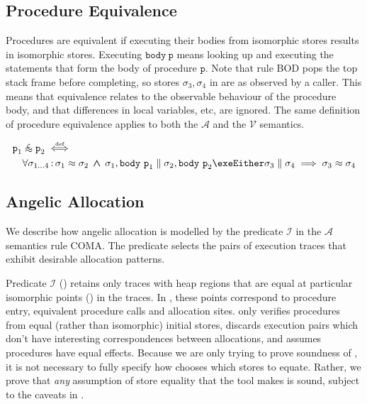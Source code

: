 \documentclass[runningheads,a4paper]{llncs}
\DeclareMathOperator{\band}{\bm{\;\land\;}}
\DeclareMathOperator{\suchthat}{:}
\newcommand*{\qvars}[2]{#1_{#2}}
\newcommand*{\defiff}{\stackrel{\text{\tiny def}}{\iff}}
\newcommand*{\sima}[1]{%
  \mathrel{\vcenter{\offinterlineskip
  \hbox{$\scriptscriptstyle\,\mathcal{#1}$}\vskip-.00ex\hbox{$\sim$}\vskip-.35ex\hbox{$\sim$}}}}
\newcommand*\iso{\approx}
\newcommand*\isol{\sima{L}}
\newcommand*{\parcomp}{\parallel}
\newcommand*\Asemantics{\mathcal{A}}
\newcommand*\asemantics{$\Asemantics$ semantics}
\newcommand*\Vsemantics{\mathcal{V}}
\newcommand*{\composeRuleAbstract}{\textnormal{COMA}}
\newcommand*{\bodyRule}{\textnormal{BOD}}
\newcommand*{\body}{\mathtt{body}}
\newcommand*{\fun}{\texttt{p}}
\newcommand*{\isoR}{\mathcal{I}}
\newcommand*{\store}{\sigma}
\begin{document}
\subsection{Procedure Equivalence}

Procedures are equivalent if executing their bodies from isomorphic stores results in isomorphic stores. Executing $\body~\fun$ means looking up and executing the statements that form the body of procedure $\fun$. Note that rule \bodyRule{} pops the top stack frame before completing, so stores $\store_3,\store_4$ in  are as observed by a caller. This means that equivalence relates to the observable behaviour of the procedure body, and that differences in local variables, etc, are ignored. The same definition of procedure equivalence applies to both the $\Asemantics$ and the $\Vsemantics$ semantics.

\begin{definition}\label{def:procedure equivalence}\setlength{\parindent}{0cm}
\[\begin{aligned}
&\fun_1 \isol \fun_2 \defiff \\
&\quad\forall \qvars{\store}{1 \ldots 4} \suchthat
	\store_1 \iso \store_2 \band
        \store_1,\body~\fun_1 \parcomp \store_2,\body~\fun_2 \exeEither \store_3 \parcomp \store_4
	\implies
	\store_3 \iso \store_4
\end{aligned}\]
\end{definition}

\subsection{Angelic Allocation}

We describe how angelic allocation is modelled by the predicate $\isoR$ in the \asemantics{} rule \composeRuleAbstract{}. The predicate selects the pairs of execution traces that exhibit desirable allocation patterns.

Predicate $\isoR$ () retains only traces with heap regions that are equal at particular isomorphic points () in the traces. In \tool{}, these points correspond to procedure entry, equivalent procedure calls and allocation sites. \tool{} only verifies procedures from equal (rather than isomorphic) initial stores, discards execution pairs which don't have interesting correspondences between allocations, and assumes procedures have equal effects. Because we are only trying to prove soundness of \metho{}, it is not necessary to fully specify how \tool{} chooses which stores to equate. Rather, we prove that \emph{any} assumption of store equality that the tool makes is sound, subject to the caveats in .
\end{document}
